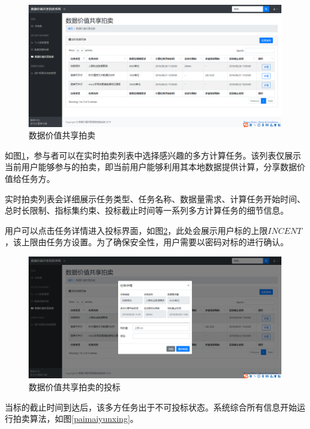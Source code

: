 \documentclass[promaster]{thesis-uestc}
\begin{document}
\begin{figure}[H]
    \includegraphics[width=400pt]{ui/paimai.png}
    \caption{数据价值共享拍卖}
    \label{paimai}
\end{figure}

如图\ref{paimai}，参与者可以在实时拍卖列表中选择感兴趣的多方计算任务。该列表仅展示当前用户能够参与的拍卖，即当前用户能够利用其本地数据提供计算，分享数据价值给任务方。

实时拍卖列表会详细展示任务类型、任务名称、数据量需求、计算任务开始时间、总时长限制、指标集约束、投标截止时间等一系列多方计算任务的细节信息。

用户可以点击任务详情进入投标界面，如图\ref{paimaitoubiao}，此处会展示用户标的上限$INCENT$，该上限由任务方设置。为了确保安全性，用户需要以密码对标的进行确认。

\begin{figure}[H]
    \includegraphics[width=400pt]{ui/paimaitoubiao.png}
    \caption{数据价值共享拍卖的投标}
    \label{paimaitoubiao}
\end{figure}

当标的截止时间到达后，该多方任务出于不可投标状态。系统综合所有信息开始运行拍卖算法，如图\ref{paimaiyunxing}。
\end{document}
